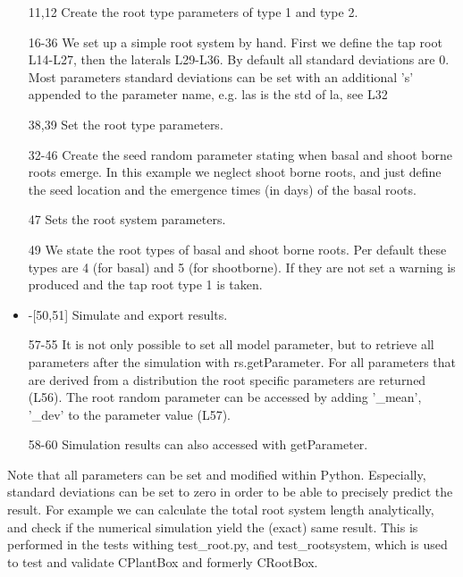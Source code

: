 \documentclass[a4paper]{article}
\begin{document}


\begin{itemize}

\item[11,12] Create the root type parameters of type 1 and type 2.
\item[16-36] We set up a simple root system by hand. First we define the tap root L14-L27, then the laterals L29-L36. By default all standard deviations are 0. Most parameters standard deviations can be set with an additional 's' appended to the parameter name, e.g. las is the std of la, see L32
\item[38,39] Set the root type parameters.

\item[32-46] Create the seed random parameter stating when basal and shoot borne roots emerge. In this example we neglect shoot borne roots, and just define the seed location and  the emergence times (in days) of the basal roots.
\item[47] Sets the root system parameters.

\item[49] We state the root types of basal and shoot borne roots. Per default these types are 4 (for basal) and 5 (for shootborne). If they are not set a warning is produced and the tap root type 1 is taken. 
\item-[50,51] Simulate and export results. 

\item[57-55] It is not only possible to set all model parameter, but to retrieve all parameters after the simulation with rs.getParameter. For all parameters that are derived from a distribution the root specific parameters are returned (L56). The root random parameter can be accessed by adding '\_mean', '\_dev' to the parameter value (L57).  

\item[58-60] Simulation results can also accessed with getParameter. 

\end{itemize}

Note that all parameters can be set and modified within Python. Especially, standard deviations can be set to zero in order to be able to precisely predict the result. For example we can calculate the total root system length analytically, and check if the numerical simulation yield the (exact) same result. This is performed in the tests withing test\_root.py, and test\_rootsystem, which is used to test and validate CPlantBox and formerly CRootBox.
\end{document}
